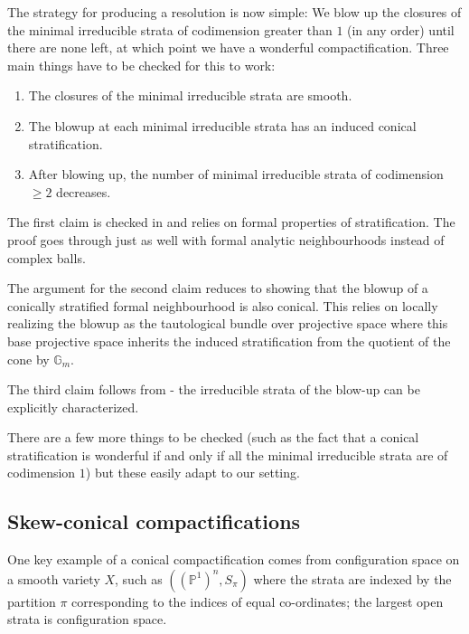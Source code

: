 \documentclass[10pt]{article}
\theoremstyle{plain}
\theoremstyle{definition}
\numberwithin{equation}{section}
\begin{document}
The strategy for producing a resolution is now simple: We blow up the closures of the minimal irreducible strata of codimension greater than $1$ (in any order) until there are none left, at which point we have a wonderful compactification. Three main things have to be checked for this to work:
\begin{lst}\label{item: claims to check for resolution}
\begin{enumerate}
    \item The closures of the minimal irreducible strata are smooth.
    \item The blowup at each minimal irreducible strata has an induced conical stratification.
    \item After blowing up, the number of minimal irreducible strata of codimension $\geq 2$ decreases.
\end{enumerate}
\end{lst}

The first claim is checked in \cite[\S 2.3]{macpherson1998making} and relies on formal properties of stratification. The proof goes through just as well with formal analytic neighbourhoods instead of complex balls. 

The argument \cite[\S 2.2]{macpherson1998making} for the second claim reduces to showing that the blowup of a conically stratified formal neighbourhood is also conical. This relies on locally realizing the blowup as the tautological bundle over projective space where this base projective space inherits the induced stratification from the quotient of the cone by $\mathbb G_m$.

The third claim follows from \cite[\S 2.2, Lemma]{macpherson1998making} - the irreducible strata of the blow-up can be explicitly characterized.

There are a few more things to be checked (such as the fact that a conical stratification is wonderful if and only if all the minimal irreducible strata are of codimension $1$) but these easily adapt to our setting.

\subsection{Skew-conical compactifications}

One key example of a conical compactification comes from configuration space on a smooth variety $X$, such as $((\mathbb P^1)^n,S_\pi)$ where the strata are indexed by the partition $\pi$ corresponding to the indices of equal co-ordinates; the largest open strata is configuration space. 
\end{document}
